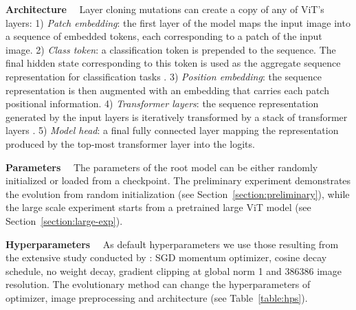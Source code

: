 \documentclass{article} \usepackage{iclr2023_conference,times}
\begin{document}
\textbf{Architecture} \ \  
Layer cloning mutations can create a copy of any of ViT's layers: 1) \emph{Patch embedding}: the first layer of the model
maps the input image into a sequence of embedded tokens, each corresponding to a patch of the input image. 2) \emph{Class token}: a classification token is prepended to the sequence. The final hidden state corresponding to this token is used as the aggregate sequence representation for classification tasks \citep{Devlin2019BERTPO}.
3) \emph{Position embedding}: the sequence representation is then augmented with an embedding that carries each patch positional information.
4) \emph{Transformer layers}: the sequence representation generated by the input layers is iteratively transformed by a stack of transformer layers \citep{Vaswani2017AttentionIA}.
5) \emph{Model head}: a final
fully connected layer mapping the representation
produced by the top-most transformer layer into the logits.

\textbf{Parameters} \ \ 
The parameters of the root model can be either randomly initialized or loaded from a checkpoint.
The preliminary experiment demonstrates the evolution from random initialization (see Section~\ref{section:preliminary}), while the large scale experiment starts from a pretrained large ViT model (see Section~\ref{section:large-exp}).


\textbf{Hyperparameters} \ \
As default hyperparameters we use those resulting from the extensive study conducted by \citet{Steiner2021HowTT}: SGD momentum optimizer, cosine decay schedule, no weight decay, gradient clipping at global norm 1 and 386386 image resolution.
The evolutionary method can change the hyperparameters of optimizer,
image preprocessing and architecture (see Table~\ref{table:hps}).
\end{document}
